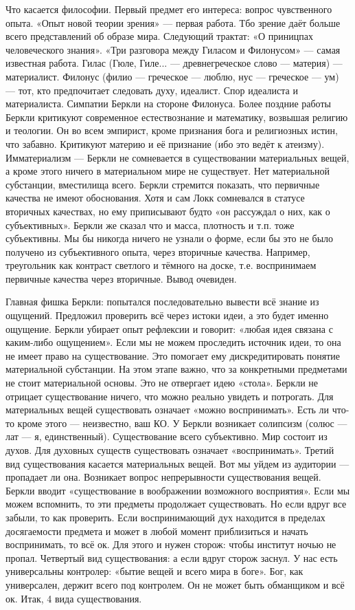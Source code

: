 Что касается философии. Первый предмет его интереса: вопрос чувственного опыта. «Опыт новой теории зрения» --- первая работа. Тбо зрение даёт больше всего представлений об образе мира. Следующий трактат: «О приницпах человеческого знания». «Три разговора между Гиласом и Филонусом» --- самая известная работа. 
Гилас (Гюле, Гиле... --- древнегреческое слово --- материя) --- материалист. Филонус (филио --- греческое --- люблю, нус --- греческое --- ум) --- тот, кто предпочитает следовать духу, идеалист. Спор идеалиста и материалиста. Симпатии Беркли на стороне Филонуса.
Более поздние работы Беркли критикуют современное естествознание и математику, возвышая религию и теологии.
Он во всем эмпирист, кроме признания бога и религиозных истин, что забавно. Критикуют материю и её признание (ибо это ведёт к атеизму). Имматериализм --- Беркли не сомневается в существовании материальных вещей, а кроме этого ничего в материальном мире не существует. Нет материальной субстанции, вместилища всего.
Беркли стремится показать, что первичные качества не имеют обоснования. Хотя и сам Локк сомневался в статусе вторичных качествах, но ему приписывают будто «он рассуждал о них, как о субъективных». Беркли же сказал что и масса, плотность и т.п. тоже субъективны. Мы бы никогда ничего не узнали о форме, если бы это не было получено из субъективного опыта, через вторичные качества. Например, треугольник как контраст светлого и тёмного на доске, т.е. воспринимаем первичные качества через вторичные. Вывод очевиден.

Главная фишка Беркли: попытался последовательно вывести всё знание из ощущений. Предложил проверить всё через истоки идеи, а это будет именно ощущение. Беркли убирает опыт рефлексии и говорит: «любая идея связана с каким-либо ощущением». Если мы не можем проследить источник идеи, то она не имеет право на существование. Это помогает ему дискредитировать понятие материальной субстанции.
На этом этапе важно, что за конкретными предметами не стоит материальной основы. Это не отвергает идею «стола». Беркли не отрицает существование ничего, что можно реально увидеть и потрогать. Для материальных вещей существовать означает «можно воспринимать». Есть ли что-то кроме этого --- неизвестно, ваш КО.
У Беркли возникает солипсизм (солюс --- лат --- я, единственный). Существование всего субъективно. Мир состоит из духов. Для духовных существ существовать означает «воспринимать». Третий вид существования касается материальных вещей. Вот мы уйдем из аудитории --- пропадает ли она. Возникает вопрос непрерывности существования вещей. Беркли вводит «существование в воображении возможного восприятия». Если мы можем вспомнить, то эти предметы продолжает существовать. Но если вдруг все забыли, то как проверить. Если воспринимающий дух находится в пределах досягаемости предмета и может в любой момент приблизиться и начать воспринимать, то всё ок. Для этого и нужен сторож: чтобы институт ночью не пропал. Четвертый вид существования: а если вдруг сторож заснул. У нас есть универсальны контролер: «бытие вещей и всего мира в боге». Бог, как универсален, держит всего под контролем. Он не может быть обманщиком и всё ок. Итак, 4 вида существования.

